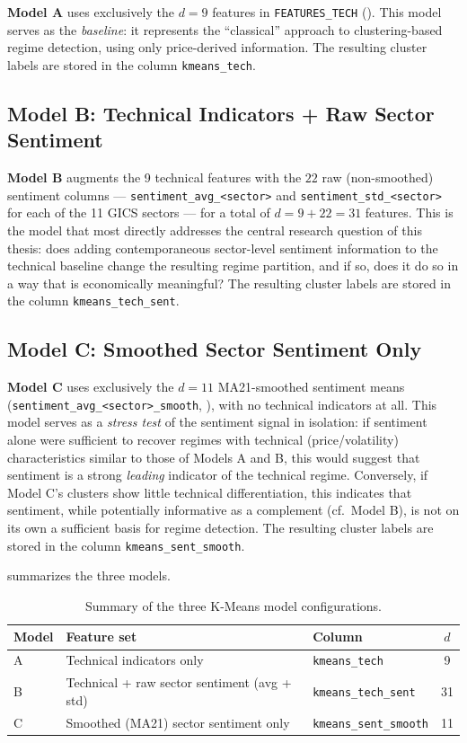 \textbf{Model A} uses exclusively the $d=9$ features in
\texttt{FEATURES\_TECH} (). This model serves as
the \emph{baseline}: it represents the ``classical'' approach to
clustering-based regime detection, using only price-derived information.
The resulting cluster labels are stored in the column
\texttt{kmeans\_tech}.

\subsection{Model B: Technical Indicators + Raw Sector Sentiment}

\textbf{Model B} augments the 9 technical features with the $22$ raw
(non-smoothed) sentiment columns --- \texttt{sentiment\_avg\_<sector>} and
\texttt{sentiment\_std\_<sector>} for each of the 11 GICS sectors --- for
a total of $d = 9 + 22 = 31$ features. This is the model that most
directly addresses the central research question of this thesis: does
adding contemporaneous sector-level sentiment information to the
technical baseline change the resulting regime partition, and if so, does
it do so in a way that is economically meaningful? The resulting cluster
labels are stored in the column \texttt{kmeans\_tech\_sent}.

\subsection{Model C: Smoothed Sector Sentiment Only}

\textbf{Model C} uses exclusively the $d=11$ MA21-smoothed sentiment means
(\texttt{sentiment\_avg\_<sector>\_smooth}, ), with
no technical indicators at all. This model serves as a \emph{stress test}
of the sentiment signal in isolation: if sentiment alone were sufficient
to recover regimes with technical (price/volatility) characteristics
similar to those of Models A and B, this would suggest that sentiment is a
strong \emph{leading} indicator of the technical regime. Conversely, if
Model C's clusters show little technical differentiation, this indicates
that sentiment, while potentially informative as a complement
(cf.\ Model B), is not on its own a sufficient basis for regime detection.
The resulting cluster labels are stored in the column
\texttt{kmeans\_sent\_smooth}.

 summarizes the three models.

\begin{table}[H]
\centering
\caption{Summary of the three K-Means model configurations.}
\label{tab:model-summary}
\begin{tabular}{lllc}
\toprule
\textbf{Model} & \textbf{Feature set} & \textbf{Column} & \textbf{$d$} \\
\midrule
A & Technical indicators only & \texttt{kmeans\_tech} & 9 \\
B & Technical + raw sector sentiment (avg + std) & \texttt{kmeans\_tech\_sent} & 31 \\
C & Smoothed (MA21) sector sentiment only & \texttt{kmeans\_sent\_smooth} & 11 \\
\bottomrule
\end{tabular}
\end{table}

